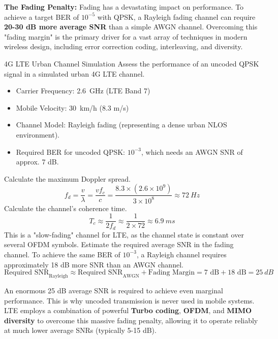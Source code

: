 \begin{warningbox}
    \textbf{The Fading Penalty:} Fading has a devastating impact on performance. To achieve a target BER of $10^{-5}$ with QPSK, a Rayleigh fading channel can require \textbf{20-30 dB more average SNR} than a simple AWGN channel. Overcoming this "fading margin" is the primary driver for a vast array of techniques in modern wireless design, including error correction coding, interleaving, and diversity.
\end{warningbox}


\begin{workedexample}{4G LTE Urban Channel Simulation}
     Assess the performance of an uncoded QPSK signal in a simulated urban 4G LTE channel.
    \begin{itemize}
        \item Carrier Frequency: \qty{2.6}{GHz} (LTE Band 7)
        \item Mobile Velocity: \qty{30}{km/h} (8.3 m/s)
        \item Channel Model: Rayleigh fading (representing a dense urban NLOS environment).
        \item Required BER for uncoded QPSK: $10^{-3}$, which needs an AWGN SNR of approx. 7 dB.
    \end{itemize}
    \begin{derivationsteps}
        \step Calculate the maximum Doppler spread.
        \[ f_d = \frac{v}{\lambda} = \frac{v f_c}{c} = \frac{8.3 \times (2.6 \times 10^9)}{3 \times 10^8} \approx \qty{72}{Hz} \]
        \step Calculate the channel's coherence time.
        \[ T_c \approx \frac{1}{2f_d} \approx \frac{1}{2 \times 72} \approx \qty{6.9}{ms} \]
        This is a "slow-fading" channel for LTE, as the channel state is constant over several OFDM symbols.
        \step Estimate the required average SNR in the fading channel. To achieve the same BER of $10^{-3}$, a Rayleigh channel requires approximately 18 dB more SNR than an AWGN channel.
        \[ \text{Required SNR}_{\text{Rayleigh}} \approx \text{Required SNR}_{\text{AWGN}} + \text{Fading Margin} = 7 \text{ dB} + 18 \text{ dB} = \qty{25}{dB} \]
    \end{derivationsteps}
     An enormous 25 dB average SNR is required to achieve even marginal performance. This is why uncoded transmission is never used in mobile systems. LTE employs a combination of powerful \textbf{Turbo coding}, \textbf{OFDM}, and \textbf{MIMO diversity} to overcome this massive fading penalty, allowing it to operate reliably at much lower average SNRs (typically 5-15 dB).
\end{workedexample}


